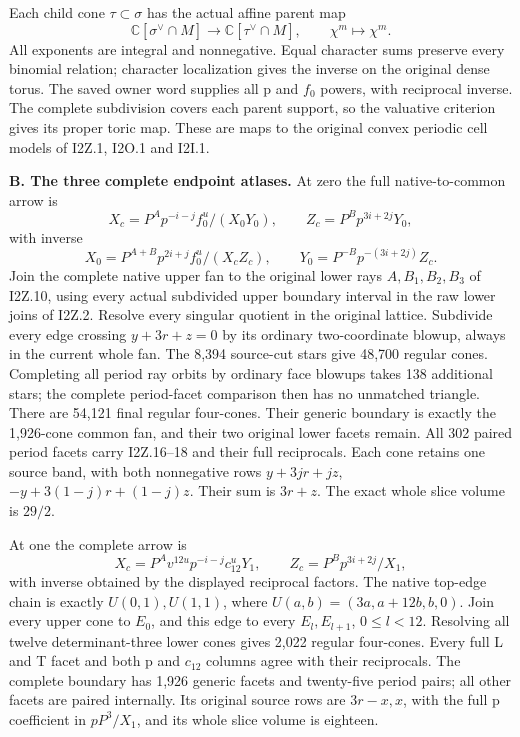 Each child cone \(\tau\subset\sigma\) has the actual affine parent map
\[
 \mathbb C[\sigma^\vee\cap M]\longrightarrow
 \mathbb C[\tau^\vee\cap M],\qquad\chi^m\longmapsto\chi^m.
\]
All exponents are integral and nonnegative.  Equal character sums preserve
every binomial relation; character localization gives the inverse on the
original dense torus.  The saved owner word supplies all p and \(f_0\)
powers, with reciprocal inverse.  The complete subdivision covers each
parent support, so the valuative criterion gives its proper toric map.
These are maps to the original convex periodic cell models of I2Z.1,
I2O.1 and I2I.1.

\medskip\noindent\textbf{B. The three complete endpoint atlases.}
At zero the full native-to-common arrow is
\[
 X_c=P^Ap^{-i-j}f_0^u/(X_0Y_0),\qquad
 Z_c=P^Bp^{3i+2j}Y_0,
\]
with inverse
\[
 X_0=P^{A+B}p^{2i+j}f_0^u/(X_cZ_c),\qquad
 Y_0=P^{-B}p^{-(3i+2j)}Z_c.
\]
Join the complete native upper fan to the original lower rays
\(A,B_1,B_2,B_3\) of I2Z.10, using every actual subdivided upper boundary
interval in the raw lower joins of I2Z.2.  Resolve every singular quotient
in the original lattice.  Subdivide every edge crossing
\(y+3r+z=0\) by its ordinary two-coordinate blowup, always in the current
whole fan.  The 8,394 source-cut stars give 48,700 regular cones.  Completing
all period ray orbits by ordinary face blowups takes 138 additional stars;
the complete period-facet comparison then has no unmatched triangle.
There are 54,121 final regular four-cones.  Their generic boundary is
exactly the 1,926-cone common fan, and their two original lower facets
remain.  All 302 paired period facets carry I2Z.16--18 and their full
reciprocals.  Each cone retains one source band, with both nonnegative rows
\(y+3jr+jz\), \(-y+3(1-j)r+(1-j)z\).  Their sum is \(3r+z\).
The exact whole slice volume is \(29/2\).

At one the complete arrow is
\[
 X_c=P^Av^{12u}p^{-i-j}c_{12}^uY_1,\qquad
 Z_c=P^Bp^{3i+2j}/X_1,
\]
with inverse obtained by the displayed reciprocal factors.  The native
top-edge chain is exactly
\(U(0,1),U(1,1)\), where
\(U(a,b)=(3a,a+12b,b,0)\).  Join every upper cone to \(E_0\), and this
edge to every \(E_l,E_{l+1}\), \(0\leq l<12\).  Resolving all twelve
determinant-three lower cones gives 2,022 regular four-cones.  Every full
L and T facet and both p and \(c_{12}\) columns agree with their
reciprocals.  The complete boundary has 1,926 generic facets and twenty-five
period pairs; all other facets are paired internally.  Its original source
rows are \(3r-x,x\), with the full p coefficient in \(pP^3/X_1\),
and its whole slice volume is eighteen.

